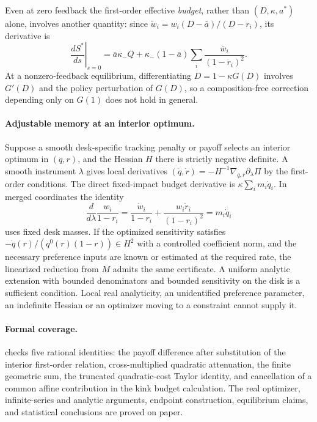 \documentclass[12pt]{article}
\theoremstyle{definition}
\theoremstyle{remark}
\begin{document}
Even at zero feedback the first-order effective \emph{budget}, rather than
$(D,\kappa,a^*)$ alone, involves another quantity: since
$\tilde w_i=w_i(D-\bar a)/(D-r_i)$, its derivative is
\[
 \left.\frac{d S^*}{ds}\right|_{s=0}
   =\bar a\kappa_- Q + \kappa_-(1-\bar a)
                  \sum_i \frac{\bar w_i}{(1-r_i)^2}.
\]
At a nonzero-feedback equilibrium, differentiating $D=1-\kappa G(D)$ involves
$G'(D)$ and the policy perturbation of $G(D)$, so a composition-free correction
depending only on $G(1)$ does not hold in general.

\paragraph{Adjustable memory at an interior optimum.}
Suppose a smooth desk-specific tracking penalty or payoff selects an interior
optimum in $(q,r)$, and the Hessian $H$ there is strictly negative definite. A smooth
instrument $\lambda$ gives local derivatives $(\dot q,\dot r)=-H^{-1}
\nabla_{q,r}\partial_\lambda \Pi$ by the first-order conditions. The direct
fixed-impact budget derivative is $\kappa\sum_i m_i\dot q_i$. In merged coordinates
the identity
\[
 \frac{d}{d\lambda}\frac{w_i}{1-r_i}
   =\frac{\dot w_i}{1-r_i}+\frac{w_i\dot r_i}{(1-r_i)^2}=m_i\dot q_i
\]
uses fixed desk masses. If the optimized sensitivity satisfies
$-\dot q(r)/(q^0(r)(1-r))\in H^2$ with a controlled coefficient norm, and the
necessary preference inputs are known or estimated at the required rate, the
linearized reduction from $M$ admits the same certificate. A uniform analytic
extension with bounded denominators and bounded sensitivity on the disk is a
sufficient condition. Local real analyticity, an unidentified preference parameter,
an indefinite Hessian or an optimizer moving to a constraint cannot supply it.

\paragraph{Formal coverage.}
 checks five rational identities:
the payoff difference after substitution of the interior first-order relation,
cross-multiplied quadratic attenuation, the finite geometric sum, the truncated quadratic-cost Taylor identity, and
cancellation of a common affine contribution in the kink budget calculation.
The real optimizer, infinite-series and analytic arguments, endpoint construction,
equilibrium claims, and statistical conclusions are proved on paper.
\end{document}
